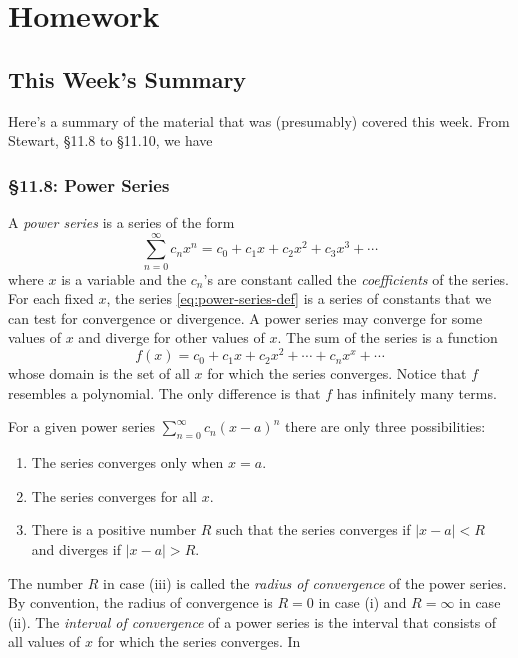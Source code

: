 \chapter{Homework}
\section{This Week's Summary}
Here's a summary of the material that was (presumably) covered this week.
From Stewart, \S 11.8 to \S 11.10, we have
\subsection{\S 11.8: Power Series}
A \emph{power series} is a series of the form
\begin{equation}
  \label{eq:power-series-def}
\sum_{n=0}^\infty c_nx^n=c_0+c_1x+c_2x^2+c_3x^3+\dotsb
\end{equation}
where $x$ is a variable and the $c_n$'s are constant called the
\emph{coefficients} of the series. For each fixed $x$, the series
\eqref{eq:power-series-def} is a series of constants that we can test for
convergence or divergence. A power series may converge for some values of
$x$ and diverge for other values of $x$. The sum of the series is a
function
\[
f(x)=c_0+c_1x+c_2x^2+\dotsb+c_nx^x+\dotsb
\]
whose domain is the set of all $x$ for which the series converges. Notice
that $f$ resembles a polynomial. The only difference is that $f$ has
infinitely many terms.

\begin{theorem}
For a given power series $\sum_{n=0}^\infty c_n(x-a)^n$ there are only
three possibilities:
\begin{enumerate}[label=\textnormal{(\roman*)}]
\item The series converges only when $x=a$.
\item The series converges for all $x$.
\item There is a positive number $R$ such that the series converges if
  $|x-a|<R$ and diverges if $|x-a|>R$.
\end{enumerate}
\end{theorem}

The number $R$ in case (iii) is called the \emph{radius of convergence} of
the power series. By convention, the radius of convergence is $R=0$ in case
(i) and $R=\infty$ in case (ii). The \emph{interval of convergence} of a
power series is the interval that consists of all values of $x$ for which
the series converges. In

